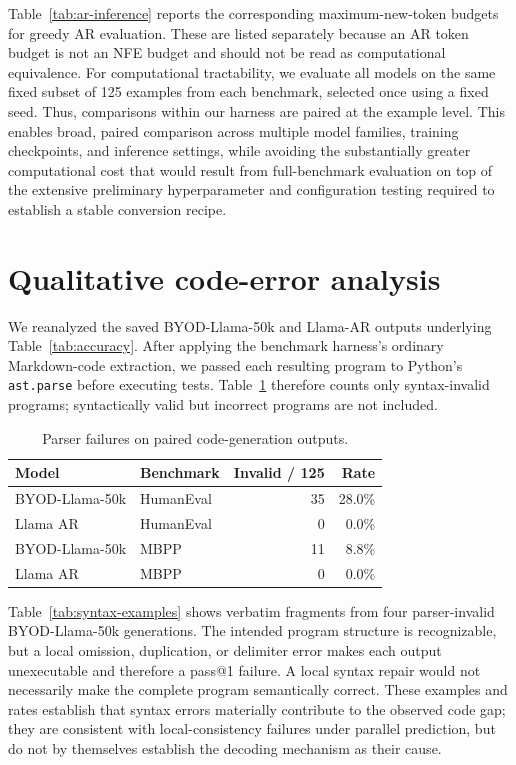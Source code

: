 \documentclass{article}
\begin{document}
Table~\ref{tab:ar-inference} reports the corresponding maximum-new-token budgets for greedy AR evaluation. These are listed separately because an AR token budget is not an NFE budget and should not be read as computational equivalence. For computational tractability, we evaluate all models on the same fixed subset of 125 examples from each benchmark, selected once using a fixed seed. Thus, comparisons within our harness are paired at the example level. This enables broad, paired comparison across multiple model families, training checkpoints, and inference settings, while avoiding the substantially greater computational cost that would result from full-benchmark evaluation on top of the extensive preliminary hyperparameter and configuration testing required to establish a stable conversion recipe.

\section{Qualitative code-error analysis}
\label{app:code-errors}

We reanalyzed the saved BYOD-Llama-50k and Llama-AR outputs underlying Table~\ref{tab:accuracy}. After applying the benchmark harness's ordinary Markdown-code extraction, we passed each resulting program to Python's \texttt{ast.parse} before executing tests. Table~\ref{tab:syntax-errors} therefore counts only syntax-invalid programs; syntactically valid but incorrect programs are not included.

\begin{table}[!htbp]
\caption{Parser failures on paired code-generation outputs.}
\label{tab:syntax-errors}
\centering
\small
\begin{tabular}{llrr}
\toprule
Model & Benchmark & Invalid / 125 & Rate \\
\midrule
BYOD-Llama-50k & HumanEval & 35 & 28.0\% \\
Llama AR & HumanEval & 0 & 0.0\% \\
BYOD-Llama-50k & MBPP & 11 & 8.8\% \\
Llama AR & MBPP & 0 & 0.0\% \\
\bottomrule
\end{tabular}
\end{table}

Table~\ref{tab:syntax-examples} shows verbatim fragments from four parser-invalid BYOD-Llama-50k generations. The intended program structure is recognizable, but a local omission, duplication, or delimiter error makes each output unexecutable and therefore a pass@1 failure. A local syntax repair would not necessarily make the complete program semantically correct. These examples and rates establish that syntax errors materially contribute to the observed code gap; they are consistent with local-consistency failures under parallel prediction, but do not by themselves establish the decoding mechanism as their cause.
\end{document}

